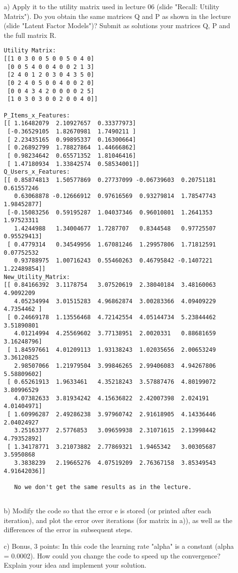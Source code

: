 \documentclass[11pt,a4paper]{scrartcl}
\begin{document}
\begin{itemize}
	\item [a)] Apply it to the utility matrix used in lecture 06 (slide "Recall: Utility Matrix"). Do you obtain the same matrices Q and P as shown in the lecture (slide "Latent Factor Models")? Submit as solutions your matrices Q, P and the full matrix R.

\begin{verbatim}	
Utility Matrix:
[[1 0 3 0 0 5 0 0 5 0 4 0]
 [0 0 5 4 0 0 4 0 0 2 1 3]
 [2 4 0 1 2 0 3 0 4 3 5 0]
 [0 2 4 0 5 0 0 4 0 0 2 0]
 [0 0 4 3 4 2 0 0 0 0 2 5]
 [1 0 3 0 3 0 0 2 0 0 4 0]]

P_Items_x_Features:
[[ 1.16482079  2.10927657  0.33377973]
 [-0.36529105  1.82670981  1.7490211 ]
 [ 2.23435165  0.99895337  0.16300664]
 [ 0.26892799  1.78827864  1.44666862]
 [ 0.98234642  0.65571352  1.81046416]
 [ 1.47180934  1.33842574  0.58534001]]
Q_Users_x_Features:
[[ 0.85874813  1.50577869  0.27737099 -0.06739603  0.20751181  0.61557246
   0.63068878 -0.12666912  0.97616569  0.93279814  1.78547743  1.98452877]
 [-0.15083256  0.59195287  1.04037346  0.96010801  1.2641353   1.97523311
   1.4244988   1.34004677  1.7287707   0.8344548   0.97725507  0.95529413]
 [ 0.4779314   0.34549956  1.67081246  1.29957806  1.71812591  0.07752532
   0.93788975  1.00716243  0.55460263  0.46795842 -0.1407221   1.22489854]]
New_Utility_Matrix:
[[ 0.84166392  3.1178754   3.07520619  2.38040184  3.48160063  4.9092209
   4.05234994  3.01515283  4.96862874  3.00283366  4.09409229  4.7354462 ]
 [ 0.24669178  1.13556468  4.72142554  4.05144734  5.23844462  3.51890801
   4.01214994  4.25569602  3.77138951  2.0020331   0.88681659  3.16248796]
 [ 1.84597661  4.01209113  1.93138243  1.02035656  2.00653249  3.36120825
   2.98507066  1.21979504  3.99846265  2.99406083  4.94267806  5.58809602]
 [ 0.65261913  1.9633461   4.35218243  3.57887476  4.80199072  3.80996529
   4.07382633  3.81934242  4.15636822  2.42007398  2.024191    4.01404971]
 [ 1.60996287  2.49286238  3.97960742  2.91618905  4.14336446  2.04024927
   3.25163377  2.5776853   3.09659938  2.31071615  2.13998442  4.79352892]
 [ 1.34178771  3.21073882  2.77869321  1.9465342   3.00305687  3.5950868
   3.3838239   2.19665276  4.07519209  2.76367158  3.85349543  4.91642036]]
   
   No we don't get the same results as in the lecture.
   
\end{verbatim}	
	\item [b)] Modify the code so that the error e is stored (or printed after each iteration), and plot the error over iterations (for matrix in a)), as well as the differences of the error in subsequent steps.
	\item [c)] Bonus, 3 points: In this code the learning rate "alpha" is a constant (alpha = 0.0002). How could you change the code to speed up the convergence? Explain your idea and implement your solution.
\end{itemize}
	
\end{document}
